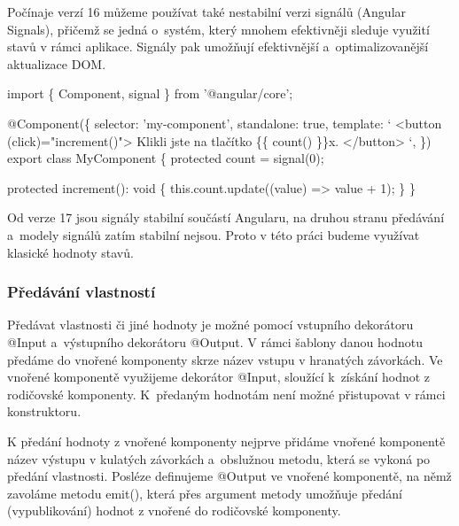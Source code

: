 Počínaje verzí 16 můžeme používat také nestabilní verzi signálů (Angular Signals), přičemž se jedná o~systém, který mnohem efektivněji sleduje využití stavů v rámci aplikace. 
Signály pak umožňují efektivnější a~optimalizovanější aktualizace DOM. 

\begin{prog}
import \{ Component, signal \} from '@angular/core';

@Component(\{
  selector: 'my-component',
  standalone: true,
  template: `
    <button (click)="increment()">
      Klikli jste na tlačítko \{\{ count() \}\}x.
    </button>
  `,
\})
export class MyComponent \{
  protected count = signal(0);

  protected increment(): void \{
    this.count.update((value) => value + 1);
  \}
\}
\end{prog}

Od verze 17 jsou signály stabilní součástí Angularu, na druhou stranu předávání a~modely signálů zatím stabilní nejsou. 
Proto v této práci budeme využívat klasické hodnoty stavů.\cite{angulardev}

\subsubsection{Předávání vlastností}

Předávat vlastnosti či jiné hodnoty je možné pomocí vstupního dekorátoru @Input a~výstupního dekorátoru @Output. 
V rámci šablony danou hodnotu předáme do vnořené komponenty skrze název vstupu v hranatých závorkách.   
Ve vnořené komponentě využijeme dekorátor @Input, sloužící k~získání hodnot z rodičovské komponenty. K~předaným hodnotám není možné přistupovat v rámci konstruktoru. 

K předání hodnoty z vnořené komponenty nejprve přidáme vnořené komponentě název výstupu v kulatých závorkách a~obslužnou metodu, která se vykoná po předání vlastnosti. 
Posléze definujeme @Output ve vnořené komponentě, na němž zavoláme metodu emit(), která přes argument metody umožňuje předání (vypublikování) hodnot z vnořené do rodičovské komponenty.\cite{angulardev,learningangular}

